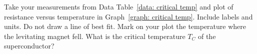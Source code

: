 \documentclass[addpoints]{physlabs}
\begin{document}
\begin{postlab}
    \filbreak
    \question[3] Take your measurements from Data Table~\ref{data: critical temp} and plot of resistance versus temperature in Graph~\ref{graph: critical temp}. 
    Include labels and units. 
    Do not draw a line of best fit.
    Mark on your plot the temperature where the levitating magnet fell.
    What is the critical temperature $T_C$ of the superconductor?
    \begin{center}
    \captionsetup{font=normalsize}
    \end{center}

    
\end{postlab}
\end{document}
